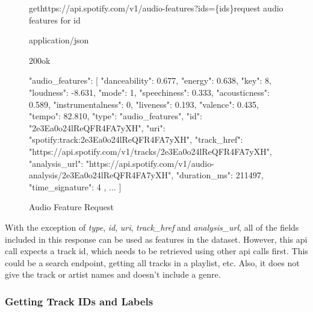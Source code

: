 \begin{figure}[H]
    \caption{Audio Feature Request}
	\label{fig:Audio Feature Request}
\begin{apiRoute}{get}{https://api.spotify.com/v1/audio-features?ids=\{ids\}}{request audio features for id}
    \methodJson
    \begin{routeParameter}
    \end{routeParameter}
    \begin{routeResponse}{application/json}
        \begin{routeResponseItem}{200}{ok}
            \begin{routeResponseItemBody}
{
    "audio_features": [
        {
            "danceability": 0.677,
            "energy": 0.638,
            "key": 8,
            "loudness": -8.631,
            "mode": 1,
            "speechiness": 0.333,
            "acousticness": 0.589,
            "instrumentalness": 0,
            "liveness": 0.193,
            "valence": 0.435,
            "tempo": 82.810,
            "type": "audio_features",
            "id": "2e3Ea0o24lReQFR4FA7yXH",
            "uri": "spotify:track:2e3Ea0o24lReQFR4FA7yXH",
            "track_href": "https://api.spotify.com/v1/tracks/2e3Ea0o24lReQFR4FA7yXH",
            "analysis_url": "https://api.spotify.com/v1/audio-analysis/2e3Ea0o24lReQFR4FA7yXH",
            "duration_ms": 211497,
            "time_signature": 4
        },
        ...
    ]
}
            \end{routeResponseItemBody}
        \end{routeResponseItem}
    \end{routeResponse}
\end{apiRoute}
\end{figure}

With the exception of \emph{type}, \emph{id}, \emph{uri}, \emph{track\_href} and \emph{analysis\_url}, all of the fields included in this response
can be used as features in the dataset. However, this api call expects a track id, which needs to be retrieved using
other api calls first. This could be a search endpoint, getting all tracks in a playlist, etc.
Also, it does not give the track or artist names and doesn't include a genre.

\subsubsection{Getting Track IDs and Labels}

